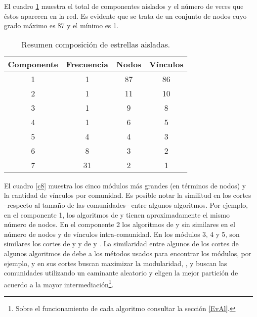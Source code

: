 \documentclass[12pt,letter]{article}
\begin{document}
El cuadro \ref{c7} muestra el total de componentes aislados y el número de veces que éstos aparecen en la red. Es evidente que se trata de un conjunto de nodos cuyo grado máximo es 87 y el mínimo es 1.

\vspace{0.5cm}

\begin{table}[h!]
\centering
\begin{tabular}{cccc}
\textbf{Componente} & \textbf{Frecuencia} &\textbf{Nodos} & \textbf{Vínculos} \\ \hline 
1 & 1 & 87 & 86  \\
2 & 1 & 11 &  10 \\
3 & 1 & 9  & 8\\
4 & 1 &  6  & 5  \\
5 & 4 &  4  & 3\\
6 &  8 &  3 & 2 \\ 
7 & 31  &  2 & 1 \\\hline
\end{tabular}
\caption{\small{Resumen composición de estrellas aisladas}.}
\label{c7}
\end{table}

\vspace{0.5cm}
El cuadro \ref{c8} muestra los cinco módulos más grandes (en términos de nodos) y la cantidad de vínculos por comunidad. Es posible notar la similitud en los cortes --respecto al tamaño de las comunidades-- entre algunos algoritmos. Por ejemplo, en el componente 1, los algoritmos de \cite{Clauset} y \cite{Pons} tienen aproximadamente el mismo número de nodos. En el componente 2 los algoritmos de \cite{Blondel} y \cite{Pons} sin similares en el número de nodos y de vínculos intra-comunidad. En los módulos 3, 4 y 5, son similares los cortes de \cite{Blondel} y \cite{Clauset} y de \cite{Raghavan} y \cite{Rosvall1}. La similaridad entre algunos de los cortes de algunos algoritmos de debe a los métodos usados para encontrar los módulos, por ejemplo, \cite{Blondel} y \cite{Clauset} en sus cortes buscan maximizar la modularidad, \cite{Pons}, \cite{Raghavan} y \cite{Rosvall1} buscan las comunidades utilizando un caminante aleatorio y \cite{Girvan1, Girvan2} eligen la mejor partición de acuerdo a la mayor intermediación\footnote{Sobre el funcionamiento de cada algoritmo consultar la sección \ref{EvAl}.}.
\end{document}
